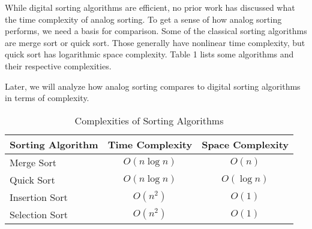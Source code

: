 While digital sorting algorithms are efficient, no prior work has discussed what the time complexity of analog sorting. To get a sense of how analog sorting performs, we need a basis for comparison. Some of the classical sorting algorithms are merge sort or quick sort. Those generally have nonlinear time complexity, but quick sort has logarithmic space complexity. Table 1 lists some algorithms and their respective complexities.

Later, we will analyze how analog sorting compares to digital sorting algorithms in terms of complexity. 

\begin{table}[h]
\centering
\caption{Complexities of Sorting Algorithms}
\begin{tabular}{|l|c|c|} \hline
Sorting Algorithm&Time Complexity&Space Complexity\\ \hline
Merge Sort & $O(n\log n)$& $O(n)$\\ \hline
Quick Sort & $O(n\log n)$& $O(\log n)$\\ \hline
Insertion Sort & $O(n^2)$& $O(1)$\\ \hline
Selection Sort & $O(n^2)$& $O(1)$\\
\hline\end{tabular}
\end{table}



